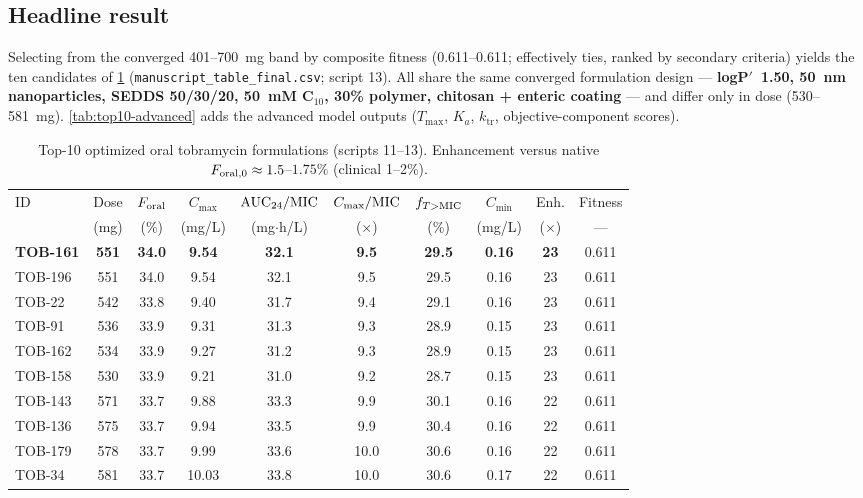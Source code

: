 \subsection{Headline result}
Selecting from the converged 401--700~mg band by composite fitness (0.611--0.611; effectively ties, ranked by secondary criteria) yields the ten candidates of \cref{tab:top10} (\texttt{manuscript\_table\_final.csv}; script 13). All share the same converged formulation design --- \textbf{logP$'$~1.50, 50~nm nanoparticles, SEDDS 50/30/20, 50~mM C$_{10}$, 30\% polymer, chitosan + enteric coating} --- and differ only in dose (530--581~mg). \cref{tab:top10-advanced} adds the advanced model outputs ($T_{\max}$, $K_a$, $k_{\mathrm{tr}}$, objective-component scores).

\begin{table}[htbp]
\centering
\caption{Top-10 optimized oral tobramycin formulations (scripts 11--13). Enhancement versus native $F_{\mathrm{oral},0}\approx1.5$--$1.75\%$ (clinical 1--2\%).}
\label{tab:top10}
\footnotesize\setlength{\tabcolsep}{3.6pt}
\begin{tabular}{lccccccccc}
\toprule
ID & Dose & $F_{\mathrm{oral}}$ & $C_{\max}$ & $\mathrm{AUC}_{24}/\mathrm{MIC}$ & $C_{\max}/\mathrm{MIC}$ & $f_{T>\mathrm{MIC}}$ & $C_{\min}$ & Enh. & Fitness\\
 & (mg) & (\%) & (mg/L) & (mg$\cdot$h/L) & ($\times$) & (\%) & (mg/L) & ($\times$) & ---\\
\midrule
\rowcolor{tobblue!12}
\textbf{TOB-161} & \textbf{551} & \textbf{34.0} & \textbf{9.54} & \textbf{32.1} & \textbf{9.5} & \textbf{29.5} & \textbf{0.16} & \textbf{23} & 0.611\\
TOB-196 & 551 & 34.0 & 9.54 & 32.1 & 9.5 & 29.5 & 0.16 & 23 & 0.611\\
TOB-22  & 542 & 33.8 & 9.40 & 31.7 & 9.4 & 29.1 & 0.16 & 23 & 0.611\\
TOB-91  & 536 & 33.9 & 9.31 & 31.3 & 9.3 & 28.9 & 0.15 & 23 & 0.611\\
TOB-162 & 534 & 33.9 & 9.27 & 31.2 & 9.3 & 28.9 & 0.15 & 23 & 0.611\\
TOB-158 & 530 & 33.9 & 9.21 & 31.0 & 9.2 & 28.7 & 0.15 & 23 & 0.611\\
TOB-143 & 571 & 33.7 & 9.88 & 33.3 & 9.9 & 30.1 & 0.16 & 22 & 0.611\\
TOB-136 & 575 & 33.7 & 9.94 & 33.5 & 9.9 & 30.4 & 0.16 & 22 & 0.611\\
TOB-179 & 578 & 33.7 & 9.99 & 33.6 & 10.0 & 30.6 & 0.16 & 22 & 0.611\\
TOB-34  & 581 & 33.7 & 10.03 & 33.8 & 10.0 & 30.6 & 0.17 & 22 & 0.611\\
\bottomrule
\end{tabular}
\end{table}

